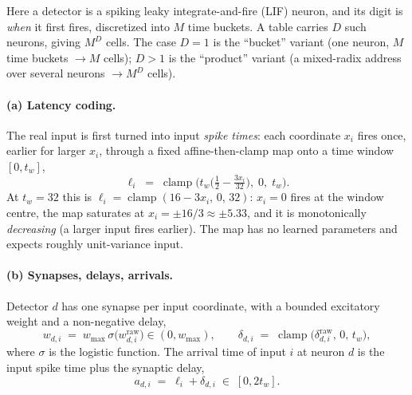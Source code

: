 \documentclass[11pt]{article}
\DeclareMathOperator{\clamp}{clamp}
\begin{document}
Here a detector is a spiking leaky integrate-and-fire (LIF) neuron, and its digit is \emph{when} it first
fires, discretized into $M$ time buckets. A table carries $D$ such neurons, giving $M^{D}$ cells. The case
$D = 1$ is the ``bucket'' variant (one neuron, $M$ time buckets $\rightarrow M$ cells); $D > 1$ is the
``product'' variant (a mixed-radix address over several neurons $\rightarrow M^{D}$ cells).

\paragraph{(a) Latency coding.} The real input is first turned into input \emph{spike times}: each coordinate
$x_i$ fires once, earlier for larger $x_i$, through a fixed affine-then-clamp map onto a time window
$[0, t_w]$,
\begin{equation}
  \ell_i \;=\; \clamp\!\Big( t_w\big(\tfrac{1}{2} - \tfrac{3 x_i}{32}\big),\; 0,\; t_w \Big).
  \label{eq:latency}
\end{equation}
At $t_w = 32$ this is $\ell_i = \clamp(16 - 3 x_i,\, 0,\, 32)$: $x_i = 0$ fires at the window centre, the map
saturates at $x_i = \pm 16/3 \approx \pm 5.33$, and it is monotonically \emph{decreasing} (a larger input
fires earlier). The map has no learned parameters and expects roughly unit-variance input.

\paragraph{(b) Synapses, delays, arrivals.} Detector $d$ has one synapse per input coordinate, with a bounded
excitatory weight and a non-negative delay,
\begin{equation}
  w_{d,i} \;=\; w_{\max}\,\sigma\!\big(w^{\mathrm{raw}}_{d,i}\big) \in (0, w_{\max}),
  \qquad
  \delta_{d,i} \;=\; \clamp\!\big(\delta^{\mathrm{raw}}_{d,i},\, 0,\, t_w\big),
\end{equation}
where $\sigma$ is the logistic function. The arrival time of input $i$ at neuron $d$ is the input spike time
plus the synaptic delay,
\begin{equation}
  a_{d,i} \;=\; \ell_i + \delta_{d,i} \;\in\; [0, 2 t_w].
\end{equation}
\end{document}
